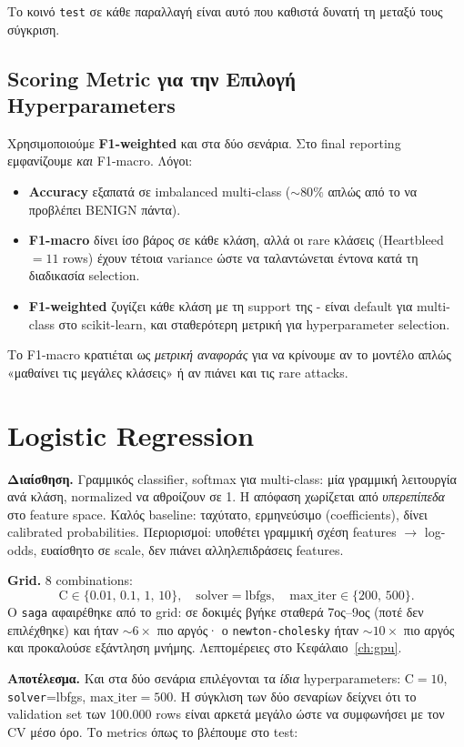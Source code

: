 \documentclass[12pt,a4paper,twoside]{book}
\begin{document}
Το κοινό \texttt{test} σε κάθε παραλλαγή είναι αυτό που καθιστά
δυνατή τη μεταξύ τους σύγκριση.

\subsection{Scoring Metric για την Επιλογή Hyperparameters}

Χρησιμοποιούμε \textbf{F1-weighted} και στα δύο σενάρια. Στο final
reporting εμφανίζουμε \emph{και} F1-macro. Λόγοι:
\begin{itemize}
    \item \textbf{Accuracy} εξαπατά σε imbalanced multi-class (\(\sim
    80\%\) απλώς από το να προβλέπει BENIGN πάντα).
    \item \textbf{F1-macro} δίνει ίσο βάρος σε κάθε κλάση, αλλά οι
    rare κλάσεις (Heartbleed \(=11\) rows) έχουν τέτοια variance ώστε
    να ταλαντώνεται έντονα κατά τη διαδικασία selection.
    \item \textbf{F1-weighted} ζυγίζει κάθε κλάση με τη support της -
    είναι default για multi-class στο scikit-learn, και σταθερότερη
    μετρική για hyperparameter selection.
\end{itemize}
Το F1-macro κρατιέται ως \emph{μετρική αναφοράς} για να κρίνουμε αν το
μοντέλο απλώς «μαθαίνει τις μεγάλες κλάσεις» ή αν πιάνει και τις rare
attacks.

\section{Logistic Regression}\label{sec:q2_lr}

\textbf{Διαίσθηση.} Γραμμικός classifier, softmax για multi-class:
μία γραμμική λειτουργία ανά κλάση, normalized να αθροίζουν σε 1. Η
απόφαση χωρίζεται από \emph{υπερεπίπεδα} στο feature space. Καλός
baseline: ταχύτατο, ερμηνεύσιμο (coefficients), δίνει calibrated
probabilities. Περιορισμοί: υποθέτει γραμμική σχέση features
\(\to\) log-odds, ευαίσθητο σε scale, δεν πιάνει αλληλεπιδράσεις
features.

\textbf{Grid.} 8 combinations:
\[
\text{C} \in \{0.01,\,0.1,\,1,\,10\},\quad
\text{solver} = \text{lbfgs},\quad
\text{max\_iter} \in \{200,\,500\}.
\]
Ο \texttt{saga} αφαιρέθηκε από το grid: σε δοκιμές βγήκε σταθερά
7ος--9ος (ποτέ δεν επιλέχθηκε) και ήταν \(\sim 6\times\) πιο αργός·
ο \texttt{newton-cholesky} ήταν \(\sim 10\times\) πιο αργός και
προκαλούσε εξάντληση μνήμης. Λεπτομέρειες στο Κεφάλαιο~\ref{ch:gpu}.

\textbf{Αποτέλεσμα.} Και στα δύο σενάρια επιλέγονται τα \emph{ίδια}
hyperparameters: \(\text{C}=10\), \texttt{solver}=lbfgs,
\(\text{max\_iter}=500\). Η σύγκλιση των δύο σεναρίων δείχνει ότι το
validation set των 100.000 rows είναι αρκετά μεγάλο ώστε να συμφωνήσει
με τον CV μέσο όρο. Το metrics όπως το βλέπουμε στο test:
\end{document}
